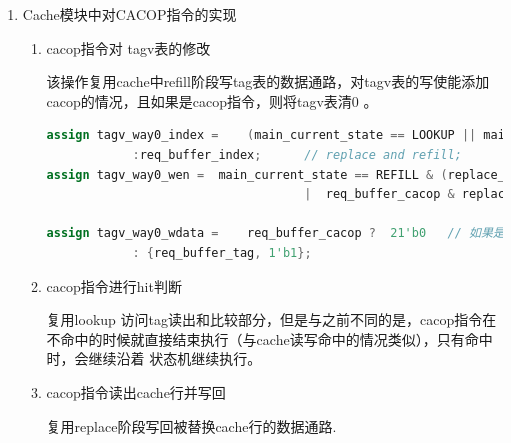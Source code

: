 \documentclass[11pt]{article}
\begin{document}
\begin{enumerate}
    所有对icache进行操作的cacop指令，在wb级发起重取信号，复用tlbwr重取指令的数据通路
\begin{lstlisting}[language=verilog]
    assign wb_refetch_flush =    wb_valid && 
    (wb_tlb_op[3]   // inst_tlbwr
    || wb_tlb_op[2]    // inst_tlbfill
    || wb_tlb_op[1]    // inst_tlbrd
    || wb_tlb_op[0]   // inst_invtlb
    || (wb_csr_we && (wb_csr_num ==14'h18 // ASID
                || wb_csr_num ==14'h0 // CRMD
                || wb_csr_num ==14'h180// DMW0
                ||wb_csr_num ==14'h181))
    || wb_icacop);       // 增加对icache进行cacop操作的

    assign wb_flush_entry =     (wb_ex || ertn_flush) ? csr_rvalue                
    :wb_pc + 32'd4;         // cacop指令重取时的pc为当前pc+4

\end{lstlisting}






    \item Cache模块中对CACOP指令的实现
    \begin{enumerate}
        \item     cacop指令对 tagv表的修改
        
        该操作复用cache中refill阶段写tag表的数据通路，对tagv表的写使能添加cacop的情况，且如果是cacop指令，则将tagv表清0 。

        \begin{lstlisting}[language=verilog]
assign tagv_way0_index =    (main_current_state == LOOKUP || main_current_state == IDLE) ? index   // look up
            :req_buffer_index;      // replace and refill;
assign tagv_way0_wen =  main_current_state == REFILL & (replace_way == 1'b0 & ret_valid & ret_last & req_buffer_type
                                    |  req_buffer_cacop & replace_way == 1'b0);     // 写使能添加cacop的情况

assign tagv_way0_wdata =    req_buffer_cacop ?  21'b0   // 如果是cacop指令，则将tagv表清0 
            : {req_buffer_tag, 1'b1};
        \end{lstlisting}
        \item cacop指令进行hit判断
        
        复用lookup 访问tag读出和比较部分，但是与之前不同的是，cacop指令在不命中的时候就直接结束执行（与cache读写命中的情况类似），只有命中时，会继续沿着
        状态机继续执行。
        \item cacop指令读出cache行并写回
        
        复用replace阶段写回被替换cache行的数据通路.


\end{enumerate}
\end{enumerate}
\end{document}
